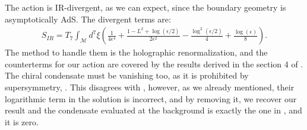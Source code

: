 The action is IR-divergent, as we can expect, since the boundary geometry is asymptotically AdS. The divergent terms are:
\begin{align}
 S_{IR} = T_7 \int_\mathcal{M} d^7\xi 
        \left( \frac{1}{4 \epsilon ^4} +\frac{1-L^2+\log \left(\epsilon/2\right)}{2 \epsilon ^2}-\frac{ \log ^2\left(\epsilon/2\right)}{4}+\frac{\log (\epsilon )}{8} \right).
\end{align}
The method to handle them is the holographic renormalization, and the counterterms for our action are covered by the results derived in the section 4 of \cite{Karch:2005ms}. The chiral condensate must be vanishing too, as it is prohibited by supersymmetry, \cite{Babington:2003vm}. This disagrees with \cite{Albash:2011nw}, however, as we already mentioned, their logarithmic term in the solution is incorrect, and by removing it, we recover our result and the condensate evaluated at the background is exactly the one in \cite{Karch:2005ms}, and it is zero.





